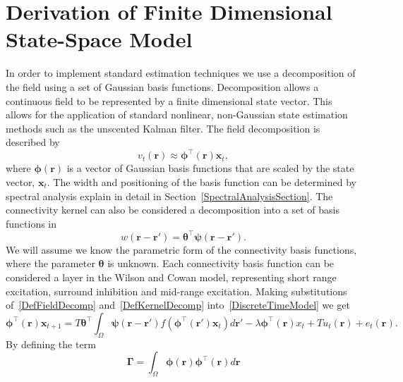 \documentclass[onecolumn,draftcls]{IEEEtran}
\begin{document}
\section{Derivation of Finite Dimensional State-Space Model}
In order to implement standard estimation techniques we use a decomposition of the field using a set of Gaussian basis functions. Decomposition allows a continuous field to be represented by a finite dimensional state vector. This allows for the application of standard nonlinear, non-Gaussian state estimation methods such as the unscented Kalman filter. The field decomposition is described by
\begin{equation}\label{DefFieldDecomp}
	v_t\left(\mathbf{r}\right) \approx \boldsymbol{\phi}^{\top}\left(\mathbf{r}\right) \mathbf{x}_t,
\end{equation}
where $\mathbf{\boldsymbol{\phi}}(\mathbf{r})$ is a vector of Gaussian basis functions that are scaled by the state vector, $\mathbf{x}_t$. The width and positioning of the basis function can be determined by spectral analysis explain in detail in Section~\ref{SpectralAnalysisSection}. The connectivity kernel can also be considered a decomposition into a set of basis functions in 
\begin{equation}\label{DefKernelDecomp}
	w\left(\mathbf{r}-\mathbf{r}'\right) = \boldsymbol{\theta}^{\top} \boldsymbol{\psi}\left(\mathbf{r}-\mathbf{r}'\right).
\end{equation}
We will assume we know the parametric form of the connectivity basis functions, where the parameter $\boldsymbol{\theta}$ is unknown. Each connectivity basis function can be considered a layer in the Wilson and Cowan model, representing short range excitation, surround inhibition and mid-range excitation. Making substitutions of~\ref{DefFieldDecomp} and~\ref{DefKernelDecomp} into~\ref{DiscreteTimeModel} we get
\begin{equation}\label{reduced continuous model}
	\boldsymbol{\phi}^{\top}\left( \mathbf{r} \right) \mathbf{x}_{t+1} = T\boldsymbol{\theta}^{\top}\int_\Omega  {\boldsymbol{\psi} \left(\mathbf{r}-\mathbf{r}'\right) f\left( \boldsymbol{\phi} ^{\top}\left(\mathbf{r}'\right)\mathbf{x}_t \right)d\mathbf{r}'}  - \lambda\boldsymbol{\phi}^{\top}\left(\mathbf{r}\right)x_t + T u_t\left(\mathbf{r}\right) + e_t\left(\mathbf{r}\right).
\end{equation}
By defining the term
\begin{equation}\label{DefGamma}
	\boldsymbol{\Gamma}  = \int_\Omega  {\boldsymbol{\phi} \left(\mathbf{r}\right)\boldsymbol{\phi} ^{\top}\left(\mathbf{r}\right)d\mathbf{r}}
\end{equation}
\end{document}
